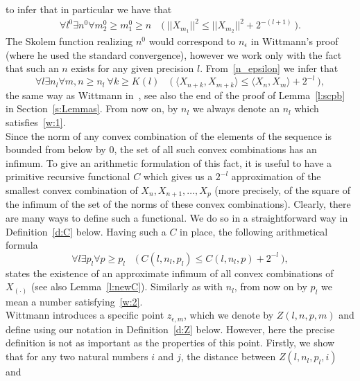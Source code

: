 to infer that in particular we have that
\begin{align}\forall l^0\exists n^0 \forall m_2^0\geq m_1^0\geq n\quad 
\big(\ ||X_{m_1}||^2 \leq ||X_{m_2}||^2 + 2^{-(l+1)}\ \big).\label{n_epsilon}\end{align}
The Skolem function realizing $n^0$ would correspond to $n_\epsilon$ in Wittmann's proof
(where he used the standard convergence), however we work only with 
the fact that such an $n$ exists for any given precision $l$. %
From~\ref{n_epsilon} we infer that
\[\forall l\exists n_l \forall m,n\geq n_l\ \forall k\geq K(l)\quad
 \big(\ \langle X_{n+k}, X_{m+k} \rangle \leq \langle X_{n}, X_{m} \rangle + 2^{-l}\ \big),\tag{W1}\label{w:1}\]
the same way as Wittmann in~\cite{Wittmann90}, see also the end of the proof of Lemma~\ref{l:scpb} in Section~\ref{s:Lemmas}.
From now on, by $n_l$ we always denote an $n_l$ which satisfies~\eqref{w:1}.\\
Since the norm of any convex combination of the elements of the sequence is bounded from below by $0$, the
set of all such convex combinations has an infimum. To give an arithmetic
formulation of this fact, it is useful to have a primitive recursive functional 
$C$ which gives us a $2^{-l}$ approximation of the smallest 
convex combination of $X_n, X_{n+1}, \ldots, X_p$
(more precisely, of the square of the infimum of the set of the norms of these convex combinations). 
Clearly, there are many ways to define such a functional. We do so in a straightforward 
way in Definition~\ref{d:C} below. Having such a $C$ in place,
the following arithmetical formula
\[
\forall l\exists p_l\forall p\geq p_l \quad  
\big(\ C(l,n_l,p_l) \leq C(l,n_l,p) + 2^{-l}\ \big),
 \tag{W2}\label{w:2} \]
states the existence of an approximate infimum of all convex combinations of $X_{(\cdot)}$
(see also Lemma~\ref{l:newC}). Similarly as with $n_l$, from now on by $p_l$ we mean
a number satisfying~\eqref{w:2}.\\
Wittmann introduces a specific point $z_{\epsilon,m}$, which we denote by $Z(l,n,p,m)$
and define using our notation in Definition~\ref{d:Z} below. However, here
the precise definition is not as important as the properties of this point.
Firstly, we show that for any two natural numbers $i$ and $j$, the distance between $Z(l,n_l,p_l,i)$ and
